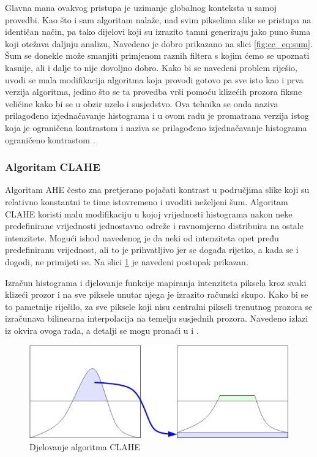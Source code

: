 \documentclass[times, utf8, diplomski]{fer}
\begin{document}
Glavna mana ovakvog pristupa je uzimanje globalnog konteksta u samoj provedbi. Kao što i sam algoritam nalaže, nad svim pikselima slike se pristupa na identičan način, pa tako dijelovi koji su izrazito tamni generiraju jako puno šuma koji otežava daljnju analizu, Navedeno je dobro prikazano na slici \ref{fig:ce_eq:sum}. Šum se donekle može smanjiti primjenom raznih filtera s kojim ćemo se upoznati kasnije, ali i dalje to nije dovoljno dobro. Kako bi se navedeni problem riješio, uvodi se mala modifikacija algoritma koja provodi gotovo pa sve isto kao i prva verzija algoritma, jedino što se ta provedba vrši pomoću klizećih prozora fiksne veličine kako bi se u obzir uzelo i susjedstvo. Ova tehnika se onda naziva prilagođeno izjednačavanje histograma  i u ovom radu je promatrana verzija istog koja je ograničena kontrastom i naziva se prilagođeno izjednačavanje histograma ograničeno kontrastom .

\subsubsection{Algoritam CLAHE}
Algoritam AHE često zna pretjerano pojačati kontrast u područjima slike koji su relativno konstantni te time istovremeno i uvoditi neželjeni šum. Algoritam CLAHE koristi malu modifikaciju u kojoj vrijednosti histograma nakon neke predefinirane vrijednosti jednostavno odreže i ravnomjerno distribuira na ostale intenzitete. Mogući ishod navedenog je da neki od intenziteta opet pređu predefiniranu vrijednost, ali to je prihvatljivo jer se događa rijetko, a kada se i dogodi, ne primijeti se. Na slici \ref{fig:clahe} je navedeni postupak prikazan.

Izračun histograma i djelovanje funkcije mapiranja intenziteta piksela kroz svaki klizeći prozor i na sve piksele unutar njega je izrazito računski skupo. Kako bi se to pametnije riješilo, za sve piksele koji nisu centralni pikseli trenutnog prozora se izračunava bilinearna interpolacija  na temelju susjednih prozora. Navedeno izlazi iz okvira ovoga rada, a detalji se mogu pronaći u \citep{wiki:clahe} i \citep{szeliski}.

\bigskip

\begin{figure}[H]
    \centering
    \includegraphics[scale=0.8]{figures/ce_examples/clahe.jpg}
    \caption[Caption for LOF]{Djelovanje algoritma CLAHE\footnotemark}
    \label{fig:clahe}
\end{figure}
\end{document}
